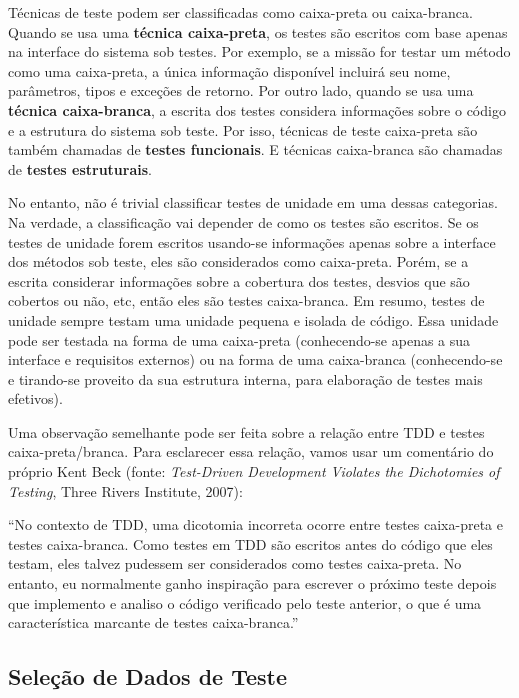 \documentclass[
  11pt,
  twoside]{book}
\renewenvironment{quote}{\centering \vspace{1.5ex} \begin{tcolorbox}[colback=backcolor, width=4.9in]}{\end{tcolorbox}}
\begin{document}
Técnicas de teste podem ser classificadas como caixa-preta ou
caixa-branca. Quando se usa uma \textbf{técnica caixa-preta}, os testes
são escritos com base apenas na interface do sistema sob testes. Por
exemplo, se a missão for testar um método como uma caixa-preta, a única
informação disponível incluirá seu nome, parâmetros, tipos e exceções de
retorno. Por outro lado, quando se usa uma \textbf{técnica
caixa-branca}, a escrita dos testes considera informações sobre o código
e a estrutura do sistema sob teste. Por isso, técnicas de teste
caixa-preta são também chamadas de \textbf{testes funcionais}. E
técnicas caixa-branca são chamadas de \textbf{testes estruturais}.

No entanto, não é trivial classificar testes de unidade em uma dessas
categorias. Na verdade, a classificação vai depender de como os testes
são escritos. Se os testes de unidade forem escritos usando-se
informações apenas sobre a interface dos métodos sob teste, eles são
considerados como caixa-preta. Porém, se a escrita considerar
informações sobre a cobertura dos testes, desvios que são cobertos ou
não, etc, então eles são testes caixa-branca. Em resumo, testes de
unidade sempre testam uma unidade pequena e isolada de código. Essa
unidade pode ser testada na forma de uma caixa-preta (conhecendo-se
apenas a sua interface e requisitos externos) ou na forma de uma
caixa-branca (conhecendo-se e tirando-se proveito da sua estrutura
interna, para elaboração de testes mais efetivos).

 Uma observação semelhante pode ser feita sobre a
relação entre TDD e testes caixa-preta/branca. Para esclarecer essa
relação, vamos usar um comentário do próprio Kent Beck (fonte:
\emph{Test-Driven Development Violates the Dichotomies of Testing},
Three Rivers Institute, 2007):

\begin{quote}
``No contexto de TDD, uma dicotomia incorreta ocorre entre testes
caixa-preta e testes caixa-branca. Como testes em TDD são escritos antes
do código que eles testam, eles talvez pudessem ser considerados como
testes caixa-preta. No entanto, eu normalmente ganho inspiração para
escrever o próximo teste depois que implemento e analiso o código
verificado pelo teste anterior, o que é uma característica marcante de
testes caixa-branca.''
\end{quote}

\hypertarget{seleuxe7uxe3o-de-dados-de-teste}{%
\subsection{Seleção de Dados de
Teste}\label{seleuxe7uxe3o-de-dados-de-teste}}
\end{document}
